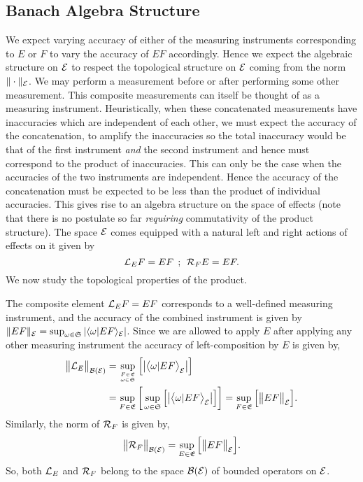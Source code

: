 \documentclass[11pt]{article}
\begin{document}
\subsection*{Banach Algebra Structure}
We expect varying accuracy of either of the measuring instruments corresponding to $E$ or $F$ to vary the accuracy of $EF$ accordingly. Hence we expect the algebraic structure on $\mathcal{E}$ to respect the topological structure on $\mathcal{E}$ coming from the norm $\|\cdot\|_{\mathcal{E}}$. We may perform a measurement before or after performing some other measurement. This composite measurements can itself be thought of as a measuring instrument. Heuristically, when these concatenated measurements have inaccuracies which are independent of each other, we must expect the accuracy of the concatenation, to amplify the inaccuracies so the total inaccuracy would be that of the first instrument \emph{and} the second instrument and hence must correspond to the product of inaccuracies. This can only be the case when the accuracies of the two instruments are independent. Hence the accuracy of the concatenation must be expected to be less than the product of individual accuracies. This gives rise to an algebra structure on the space of effects (note that there is no postulate so far \emph{requiring} commutativity of the product structure). The space $\mathcal{E}$ comes equipped with a natural left and right actions of effects on it given by
$$\mathcal{L}_E F=EF\:\:;\:\:\mathcal{R}_F E=EF.$$
We now study the topological properties of the product.
 
The composite element $\mathcal{L}_EF=EF$ corresponds to a well-defined measuring instrument, and the accuracy of the combined instrument is given by $\|EF\|_{\mathcal{E}}=\sup_{\omega\in \mathfrak{S}}|\langle \omega|EF\rangle_{\mathcal{E}}|$. Since we are allowed to apply $E$ after applying any other measuring instrument the accuracy of left-composition by $E$ is given by,
\begin{align*}
	\big\|\mathcal{L}_E\big\|_{\mathcal{B}(\mathcal{E})}&=\sup_{F\in\mathfrak{E}\atop\omega\in\mathfrak{S}} \Big[\big|\big\langle \omega|EF\big\rangle_{\mathcal{E}}\big|\Big]\\&=\sup_{F\in \mathfrak{E}}\bigg[\sup_{\omega\in \mathfrak{S}}\Big[\big|\big\langle \omega| EF \big\rangle_{\mathcal{E}}\big|\Big]\bigg]=\sup_{F\in \mathfrak{E}}\Big[\big\|EF\big\|_{\mathcal{E}}\Big].
\end{align*}
Similarly, the norm of $\mathcal{R}_F$ is given by,
$$\big\|\mathcal{R}_F\big\|_{\mathcal{B}(\mathcal{E})}=\sup_{E\in \mathfrak{E}}\Big[\big\| EF\big\|_{\mathcal{E}}\Big].$$
So, both $\mathcal{L}_E$ and $\mathcal{R}_F$ belong to the space $\mathcal{B}(\mathcal{E})$ of bounded operators on $\mathcal{E}$.
\end{document}
